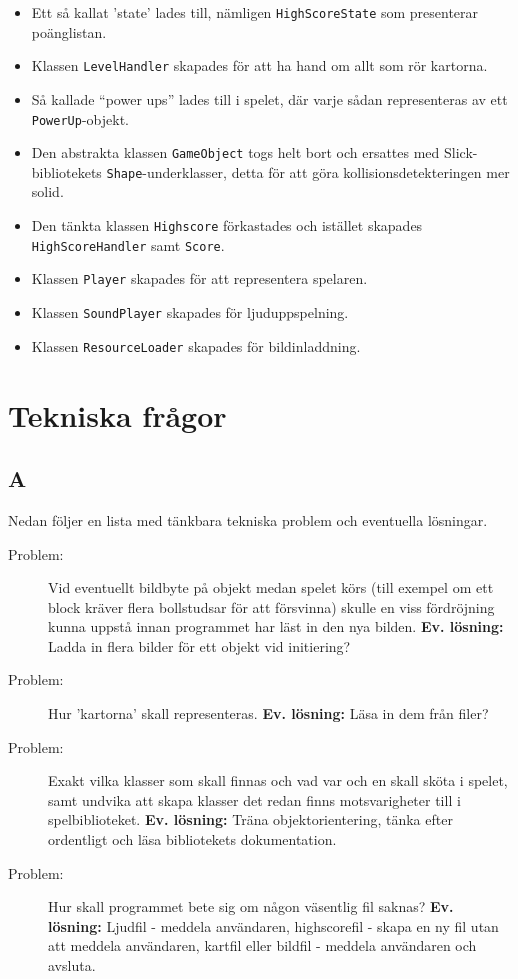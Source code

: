 \documentclass[11pt,a4paper]{article}
\begin{document}
\begin{itemize}
	\item Ett så kallat 'state' lades till, nämligen \texttt{HighScoreState} som presenterar poänglistan.
	\item Klassen \texttt{LevelHandler} skapades för att ha hand om allt som rör kartorna.
	\item Så kallade ``power ups'' lades till i spelet, där varje sådan representeras av ett \texttt{PowerUp}-objekt.
	\item Den abstrakta klassen \texttt{GameObject} togs helt bort och ersattes med Slick-bibliotekets \texttt{Shape}-underklasser, detta för att göra kollisionsdetekteringen mer solid.
	\item Den tänkta klassen \texttt{Highscore} förkastades och istället skapades \texttt{HighScoreHandler} samt \texttt{Score}.
	\item Klassen \texttt{Player} skapades för att representera spelaren.
	\item Klassen \texttt{SoundPlayer} skapades för ljuduppspelning.
	\item Klassen \texttt{ResourceLoader} skapades för bildinladdning.
\end{itemize}

\section{Tekniska frågor}

\subsection{A}
Nedan följer en lista med tänkbara tekniska problem och eventuella lösningar.
\begin{description}
	\item[Problem:] Vid eventuellt bildbyte på objekt medan spelet körs (till exempel om ett block kräver flera bollstudsar för att försvinna) skulle en viss fördröjning kunna uppstå innan programmet har läst in den nya bilden. \textbf{Ev. lösning:} Ladda in flera bilder för ett objekt vid initiering?
	\item[Problem:] Hur 'kartorna' skall representeras. \textbf{Ev. lösning:} Läsa in dem från filer?
	\item[Problem:] Exakt vilka klasser som skall finnas och vad var och en skall sköta i spelet, samt undvika att skapa klasser det redan finns motsvarigheter till i spelbiblioteket. \textbf{Ev. lösning:} Träna objektorientering, tänka efter ordentligt och läsa bibliotekets dokumentation.
	\item[Problem:] Hur skall programmet bete sig om någon väsentlig fil saknas? \textbf{Ev. lösning:} Ljudfil - meddela användaren, highscorefil - skapa en ny fil utan att meddela användaren, kartfil eller bildfil - meddela användaren och avsluta.
\end{description}
\end{document}
